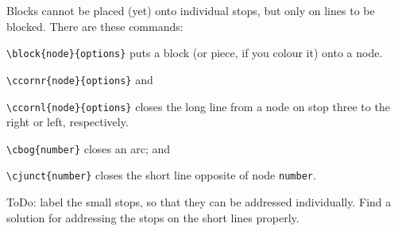 \documentclass[a5paper]{scrartcl}
\begin{document}
Blocks cannot be placed (yet) onto individual stops, but only on lines to be blocked. There are these commands:

\verb|\block{node}{options}| puts a block (or piece, if you colour it) onto a node. 

\verb|\ccornr{node}{options}| and

\verb|\ccornl{node}{options}| closes the long line from a node on stop three to the right or left, respectively.

\verb|\cbog{number}| closes an arc; and 

\verb|\cjunct{number}| closes the short line opposite of node \verb|number|.

ToDo: label the small stops, so that they can be addressed individually. Find a solution for addressing the stops on the short lines properly.
\end{document}
